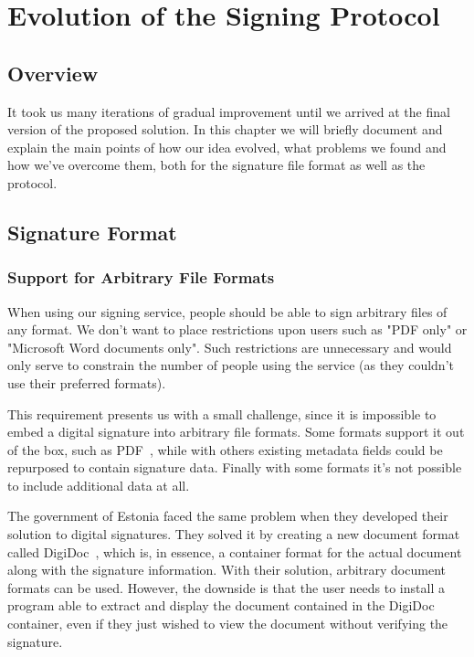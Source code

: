 \chapter{Evolution of the Signing Protocol}
\label{ch:signingprotocol}

\section{Overview}\label{sec:overview}
It took us many iterations of gradual improvement until we arrived at the final version of the proposed solution.
In this chapter we will briefly document and explain the main points of how our idea evolved,
what problems we found and how we've overcome them,
both for the signature file format as well as the protocol.

\section{Signature Format}
\label{sec:signatureformat}

\subsection{Support for Arbitrary File Formats}\label{subsec:support-for-arbitrary-file-formats}

When using our signing service, people should be able to sign arbitrary files of any format.
We don't want to place restrictions upon users such as "\gls{PDF} only" or "Microsoft Word documents only".
Such restrictions are unnecessary and would only serve to constrain the number of people using the service
(as they couldn't use their preferred formats).

This requirement presents us with a small challenge,
since it is impossible to embed a digital signature into arbitrary file formats.
Some formats support it out of the box, such as \gls{PDF}~\cite{etsipades},
while with others existing metadata fields could be repurposed to contain signature data.
Finally with some formats it's not possible to include additional data at all.

The government of Estonia faced the same problem when they developed their solution to digital signatures.
They solved it by creating a new document format called DigiDoc~\cite{digidoc},
which is, in essence, a container format for the actual document along with the signature information.
With their solution, arbitrary document formats can be used.
However, the downside is that the user needs to install a program able to extract and display the document contained in the DigiDoc container,
even if they just wished to view the document without verifying the signature.

